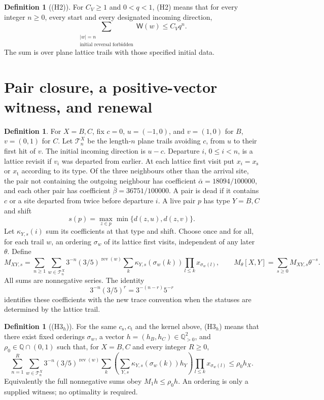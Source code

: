 \documentclass[11pt,reqno]{amsart}
\theoremstyle{definition}
\newtheorem{definition}[theorem]{Definition}
\theoremstyle{remark}
\begin{document}
\begin{definition}[(H2)]\label{h:H2}
For \(C_V\ge1\) and \(0<q<1\), (H2) means that for every
integer \(n\ge0\), every start and every designated incoming direction,
\[
 \sum_{\substack{|w|=n\\\text{initial reversal forbidden}}}
                      \mathsf W(w)\le C_Vq^n .
\]
The sum is over plane lattice trails with those specified initial data.
\end{definition}


\section{Pair closure, a positive-vector witness, and renewal}

\begin{definition}\label{d:kernel}
For \(X=B,C\), fix \(c=0\), \(u=(-1,0)\), and \(v=(1,0)\)
for \(B\), \(v=(0,1)\) for \(C\).
Let \(\mathcal T_n^X\) be the length-\(n\) plane trails avoiding
\(c\), from \(u\) to their first hit of \(v\).
The initial incoming direction is \(u-c\).
Departure \(i\), \(0\le i<n\), is a lattice revisit if \(v_i\)
was departed from earlier. At each lattice first visit put
\(x_i=x_{\mathrm s}\) or \(x_{\mathrm t}\) according to its type.
Of the three neighbours other than the arrival site, the pair not
containing the outgoing neighbour has coefficient
\(\bar\alpha=18094/100000\), and each other pair has coefficient
\(\bar\beta=36751/100000\). A pair is dead if it contains \(c\) or a
site departed from twice before departure \(i\).
A live pair \(p\) has type \(Y=B,C\) and shift
\[
 s(p)=\max_{z\in p}\min\{d(z,u),d(z,v)\}.
\]
Let \(\kappa_{Y,s}(i)\) sum its coefficients at that type and shift.
Choose once and for all, for each trail \(w\), an ordering
\(\sigma_w\) of its lattice first visits, independent of any later
\(\theta\). Define
\[
 M_{XY,s}=\sum_{n\ge1}\sum_{w\in\mathcal T_n^X}
 3^{-n}(3/5)^{\operatorname{rev}(w)}
 \sum_k\kappa_{Y,s}(\sigma_w(k))\prod_{l\le k}x_{\sigma_w(l)},\qquad
 M_\theta[X,Y]=\sum_{s\ge0}M_{XY,s}\theta^{-s}.
\]
All sums are nonnegative series. The identity
\[
 3^{-n}(3/5)^{r}=3^{-(n-r)}5^{-r}
\]
identifies these coefficients with the new trace convention when
the statuses are determined by the lattice trail.
\end{definition}

\begin{definition}[(H3\( _h\))]\label{h:H3}
For the same \(c_{\mathrm s},c_{\mathrm t}\) and the kernel above,
(H3\( _h\)) means that there exist fixed orderings \(\sigma_w\),
a vector \(h=(h_B,h_C)\in\mathbb Q_{>0}^2\), and
\(\rho_0\in\mathbb Q\cap(0,1)\) such that, for \(X=B,C\) and
every integer \(R\ge0\),
\[
 \sum_{n=1}^{R}\sum_{w\in\mathcal T_n^X}
 3^{-n}(3/5)^{\operatorname{rev}(w)}
 \sum_k\left(\sum_{Y,s}\kappa_{Y,s}(\sigma_w(k))h_Y\right)
                          \prod_{l\le k}x_{\sigma_w(l)}
 \le\rho_0h_X .
\]
Equivalently the full nonnegative sums obey \(M_1h\le\rho_0h\).
An ordering is only a supplied witness; no optimality is required.
\end{definition}
\end{document}
